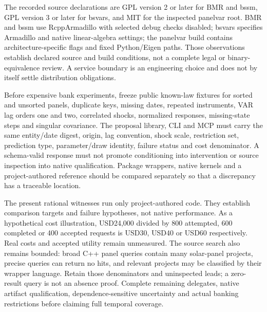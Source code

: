 The recorded source declarations are GPL version 2 or later for BMR and bssm, GPL version 3 or later for bsvars, and MIT for the inspected panelvar root. BMR and bssm use RcppArmadillo with selected debug checks disabled; bsvars specifies Armadillo and native linear-algebra settings; the panelvar build contains architecture-specific flags and fixed Python/Eigen paths. Those observations establish declared source and build conditions, not a complete legal or binary-equivalence review. A service boundary is an engineering choice and does not by itself settle distribution obligations.\citep{exec25_cdyn_bmr,exec25_cdyn_bsvars,exec25_cdyn_bssm,exec25_cdyn_panelvar}

Before expensive bank experiments, freeze public known-law fixtures for sorted and unsorted panels, duplicate keys, missing dates, repeated instruments, VAR lag orders one and two, correlated shocks, normalized responses, missing-state steps and singular covariance. The proposal library, CLI and MCP must carry the same entity/date digest, origin, lag convention, shock scale, restriction set, prediction type, parameter/draw identity, failure status and cost denominator. A schema-valid response must not promote conditioning into intervention or source inspection into native qualification. Package wrappers, native kernels and a project-authored reference should be compared separately so that a discrepancy has a traceable location.\citep{exec25_cdyn_choice}

The present rational witnesses run only project-authored code. They establish comparison targets and failure hypotheses, not native performance. As a hypothetical cost illustration, USD24,000 divided by 800 attempted, 600 completed or 400 accepted requests is USD30, USD40 or USD60 respectively. Real costs and accepted utility remain unmeasured. The source search also remains bounded: broad C++ panel queries contain many solar-panel projects, precise queries can return no hits, and relevant projects may be classified by their wrapper language. Retain those denominators and uninspected leads; a zero-result query is not an absence proof. Complete remaining delegates, native artifact qualification, dependence-sensitive uncertainty and actual banking restrictions before claiming full temporal coverage.\citep{exec25_cdyn_choice}
